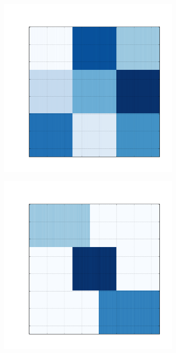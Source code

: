 \documentclass[
    12pt,                %
    oneside,            %
    a4paper,            %
    english,            %
    brazil                %
    ]{abntex2ppgsi}
\begin{document}
\begin{figure}[H]
\begin{subfigure}[b]{0.18\textwidth}
        \caption{}
    \end{subfigure}
    \begin{subfigure}[b]{0.18\textwidth}
        \includegraphics[width=\textwidth]{img/c-reconstruction-fkmeans.png}
        \caption{}
    \end{subfigure}
    \begin{subfigure}[b]{0.18\textwidth}
        \includegraphics[width=\textwidth]{img/d-reconstruction-fkmeans.png}

\end{subfigure}
\end{figure}
\end{document}
